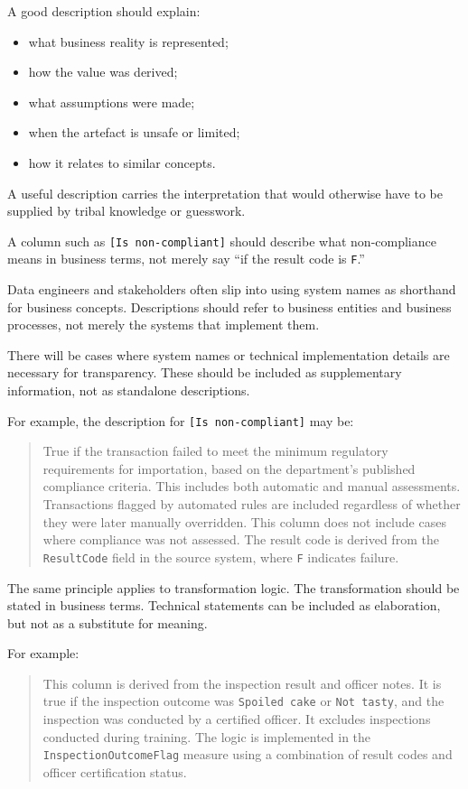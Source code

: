 \documentclass[10pt,openany,10pt]{book}
\providecommand{\tightlist}{%
  \setlength{\itemsep}{0pt}\setlength{\parskip}{0pt}}
\begin{document}
A good description should explain:

\begin{itemize}
\tightlist
\item
  what business reality is represented;
\item
  how the value was derived;
\item
  what assumptions were made;
\item
  when the artefact is unsafe or limited;
\item
  how it relates to similar concepts.
\end{itemize}

A useful description carries the interpretation that would otherwise
have to be supplied by tribal knowledge or guesswork.

A column such as \texttt{{[}Is\ non-compliant{]}} should describe what
non-compliance means in business terms, not merely say ``if the result
code is \texttt{F}.''

Data engineers and stakeholders often slip into using system names as
shorthand for business concepts. Descriptions should refer to business
entities and business processes, not merely the systems that implement
them.

There will be cases where system names or technical implementation
details are necessary for transparency. These should be included as
supplementary information, not as standalone descriptions.

For example, the description for \texttt{{[}Is\ non-compliant{]}} may
be:

\begin{quote}
True if the transaction failed to meet the minimum regulatory
requirements for importation, based on the department's published
compliance criteria. This includes both automatic and manual
assessments. Transactions flagged by automated rules are included
regardless of whether they were later manually overridden. This column
does not include cases where compliance was not assessed. The result
code is derived from the \texttt{ResultCode} field in the source system,
where \texttt{F} indicates failure.
\end{quote}

The same principle applies to transformation logic. The transformation
should be stated in business terms. Technical statements can be included
as elaboration, but not as a substitute for meaning.

For example:

\begin{quote}
This column is derived from the inspection result and officer notes. It
is true if the inspection outcome was \texttt{Spoiled\ cake} or
\texttt{Not\ tasty}, and the inspection was conducted by a certified
officer. It excludes inspections conducted during training. The logic is
implemented in the \texttt{InspectionOutcomeFlag} measure using a
combination of result codes and officer certification status.
\end{quote}
\end{document}
